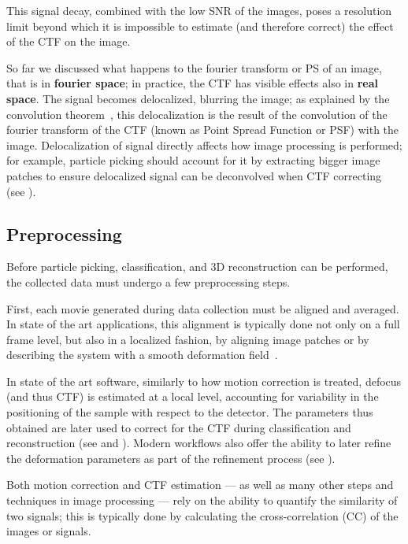 This signal decay, combined with the low SNR of the images, poses a resolution limit beyond which it is impossible to estimate (and therefore correct) the effect of the CTF on the image.

So far we discussed what happens to the fourier transform or PS of an image, that is in \textbf{fourier space}; in practice, the CTF has visible effects also in \textbf{real space}.
The signal becomes delocalized, blurring the image; as explained by the convolution theorem~\cite{wikipediaConvolutionTheorem2024}, this delocalization is the result of the convolution of the fourier transform of the CTF (known as Point Spread Function or PSF) with the image.
Delocalization of signal directly affects how image processing is performed; for example, particle picking should account for it by extracting bigger image patches to ensure delocalized signal can be deconvolved when CTF correcting (see ).

\subsection{Preprocessing}\label{em_preprocessing}

Before particle picking, classification, and 3D reconstruction can be performed, the collected data must undergo a few preprocessing steps.

First, each movie generated during data collection must be aligned and averaged.
In state of the art applications, this alignment is typically done not only on a full frame level, but also in a localized fashion, by aligning image patches or by describing the system with a smooth deformation field~\cite{zhengMotionCor2AnisotropicCorrection2017,punjaniCryoSPARCAlgorithmsRapid2017,tegunovRealtimeCryoelectronMicroscopy2019}.

In state of the art software, similarly to how motion correction is treated, defocus (and thus CTF) is estimated at a local level, accounting for variability in the positioning of the sample with respect to the detector.
The parameters thus obtained are later used to correct for the CTF during classification and reconstruction (see  and ).
Modern workflows also offer the ability to later refine the deformation parameters as part of the refinement process (see ).

Both motion correction and CTF estimation --- as well as many other steps and techniques in image processing --- rely on the ability to quantify the similarity of two signals; this is typically done by calculating the cross-correlation (CC) of the images or signals.

